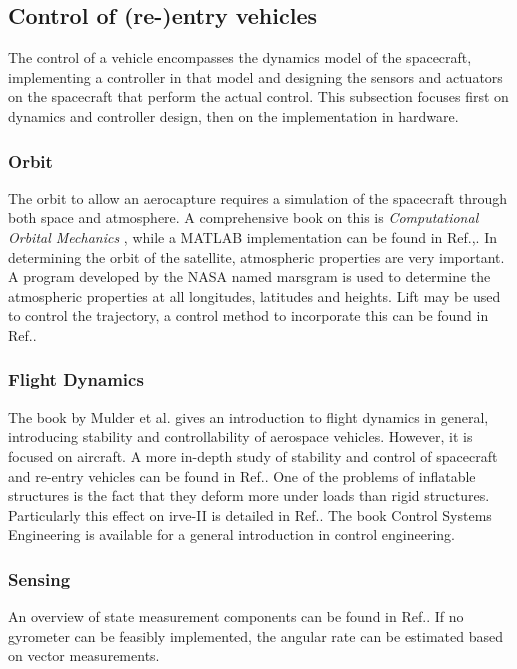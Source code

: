 \subsection{Control of (re-)entry vehicles} \label{sec:control}
The control of a vehicle encompasses the dynamics model of the spacecraft, implementing a controller in that model and designing the sensors and actuators on the spacecraft that perform the actual control. This subsection focuses first on dynamics and controller design, then on the implementation in hardware.

\subsubsection{Orbit}
The orbit to allow an aerocapture requires a simulation of the spacecraft through both space and atmosphere. A comprehensive book on this is \textit{Computational Orbital Mechanics} \cite{Weiland2004}, while a MATLAB implementation can be found in Ref.\cite{Leszczynski1998},. In determining the orbit of the satellite, atmospheric properties are very important. A program developed by the NASA named \gls{marsgram} is used to determine the atmospheric properties at all longitudes, latitudes and heights.\cite{Justus2001} Lift may be used to control the trajectory, a control method to incorporate this can be found in Ref.\cite{Esmaelzadeh2010}.

\subsubsection{Flight Dynamics}
The book by Mulder et al. gives an introduction to flight dynamics in general, introducing stability and controllability of aerospace vehicles. However, it is focused on aircraft. \cite{Mulder2013} A more in-depth study of stability and control of spacecraft and re-entry vehicles can be found in Ref.\cite{Steketee1967, Ito2002}. One of the problems of inflatable structures is the fact that they deform more under loads than rigid structures.\cite{Axdahl2009} Particularly this effect on \gls{irve}-II is detailed in Ref.\cite{Bose2009}. The book Control Systems Engineering is available for a general introduction in control engineering.\cite{Nise2011}

\subsubsection{Sensing}
An overview of state measurement components can be found in Ref.\cite{Wertz2011}. If no gyrometer can be feasibly implemented, the angular rate can be estimated based on vector measurements.\cite{Azor1998}

